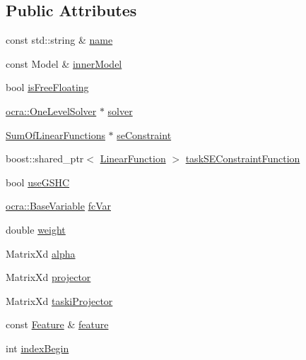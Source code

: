 \subsection*{Public Attributes}
\begin{DoxyCompactItemize}
\item 
const std\+::string \& \hyperlink{structgocra_1_1GHCJTTask_1_1Pimpl_a62bf1c09164be6cf8a48360bd6e53d64}{name}
\item 
const Model \& \hyperlink{structgocra_1_1GHCJTTask_1_1Pimpl_a7f03506d78950aa1a986d2ba44142f28}{inner\+Model}
\item 
bool \hyperlink{structgocra_1_1GHCJTTask_1_1Pimpl_a3fefbc36e9c5e9b8c4fc8f85fb19da53}{is\+Free\+Floating}
\item 
\hyperlink{classocra_1_1OneLevelSolver}{ocra\+::\+One\+Level\+Solver} $\ast$ \hyperlink{structgocra_1_1GHCJTTask_1_1Pimpl_ac9f3b5650e8663982f631c354a25e3b9}{solver}
\item 
\hyperlink{classocra_1_1SumOfLinearFunctions}{Sum\+Of\+Linear\+Functions} $\ast$ \hyperlink{structgocra_1_1GHCJTTask_1_1Pimpl_ab0953e75c824e2aa63477976b94a1806}{se\+Constraint}
\item 
boost\+::shared\+\_\+ptr$<$ \hyperlink{classocra_1_1LinearFunction}{Linear\+Function} $>$ \hyperlink{structgocra_1_1GHCJTTask_1_1Pimpl_ab1b71cfa2f203377834f529d2c0e98c3}{task\+S\+E\+Constraint\+Function}
\item 
bool \hyperlink{structgocra_1_1GHCJTTask_1_1Pimpl_a0beb46ac94216a28202956bf87fc1d2d}{use\+G\+S\+HC}
\item 
\hyperlink{classocra_1_1BaseVariable}{ocra\+::\+Base\+Variable} \hyperlink{structgocra_1_1GHCJTTask_1_1Pimpl_a98ad4a4d2e7bbba67daa244e45f75345}{fc\+Var}
\item 
double \hyperlink{structgocra_1_1GHCJTTask_1_1Pimpl_a5bf2a2e00bd9406bb6a993b616a47d07}{weight}
\item 
Matrix\+Xd \hyperlink{structgocra_1_1GHCJTTask_1_1Pimpl_a71d5221274d0ee84040992042d609cec}{alpha}
\item 
Matrix\+Xd \hyperlink{structgocra_1_1GHCJTTask_1_1Pimpl_ab17e7af214e9801bfb03e4d9ed6dad29}{projector}
\item 
Matrix\+Xd \hyperlink{structgocra_1_1GHCJTTask_1_1Pimpl_a0ae67b26b52f69987d41bc3232636ccb}{taski\+Projector}
\item 
const \hyperlink{classocra_1_1Feature}{Feature} \& \hyperlink{structgocra_1_1GHCJTTask_1_1Pimpl_aa7c75169490e6b35ff7bdb1baf696c5d}{feature}
\item 
int \hyperlink{structgocra_1_1GHCJTTask_1_1Pimpl_a20542f3c613a7f9c0771c2b5ac0b38eb}{index\+Begin}

\end{DoxyCompactItemize}
